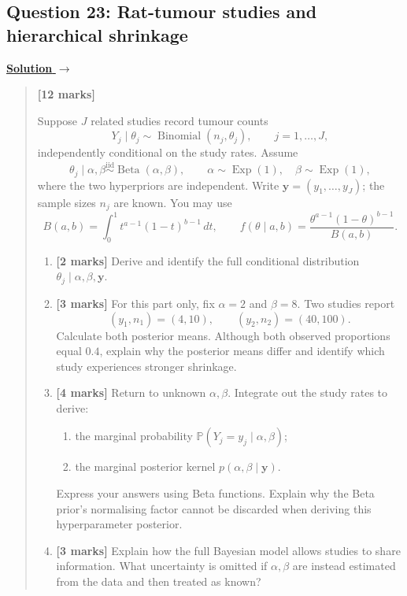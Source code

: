 \documentclass[11pt,a4paper]{article}
\newenvironment{examquestion}[2]
  {\subsection{#1}\label{question:\arabic{subsection}}\label{#2}%
   \noindent\hyperref[answer:\arabic{subsection}]{\textbf{Solution} $\rightarrow$}%
   \begin{quote}\color{statgrey}}
  {\end{quote}}
\begin{document}
\begin{examquestion}{Question 23: Rat-tumour studies and hierarchical shrinkage}{question:practice-rat-tumour-studies-and-hierarchical-shrinkage}
\textbf{[12 marks]}

Suppose $J$ related studies record tumour counts
\[
Y_j\mid\theta_j\sim\operatorname{Binomial}(n_j,\theta_j),
\qquad j=1,\ldots,J,
\]
independently conditional on the study rates. Assume
\[
\theta_j\mid\alpha,\beta
\overset{\mathrm{iid}}{\sim}\operatorname{Beta}(\alpha,\beta),
\qquad
\alpha\sim\operatorname{Exp}(1),\quad
\beta\sim\operatorname{Exp}(1),
\]
where the two hyperpriors are independent. Write
$\mathbf y=(y_1,\ldots,y_J)$; the sample sizes $n_j$ are known.
You may use
\[
B(a,b)=\int_0^1 t^{a-1}(1-t)^{b-1}\,dt,
\qquad
f(\theta\mid a,b)=\frac{\theta^{a-1}(1-\theta)^{b-1}}{B(a,b)}.
\]
\begin{enumerate}[label=(\alph*)]
  \item \textbf{[2 marks]} Derive and identify the full conditional
        distribution $\theta_j\mid\alpha,\beta,\mathbf y$.
  \item \textbf{[3 marks]} For this part only, fix $\alpha=2$ and $\beta=8$.
        Two studies report
        \[
        (y_1,n_1)=(4,10),\qquad (y_2,n_2)=(40,100).
        \]
        Calculate both posterior means. Although both observed proportions
        equal $0.4$, explain why the posterior means differ and identify
        which study experiences stronger shrinkage.
  \item \textbf{[4 marks]} Return to unknown $\alpha,\beta$. Integrate out
        the study rates to derive:
        \begin{enumerate}[label=(\roman*)]
          \item the marginal probability
                $\mathbb{P}(Y_j=y_j\mid\alpha,\beta)$;
          \item the marginal posterior kernel
                $p(\alpha,\beta\mid\mathbf y)$.
        \end{enumerate}
        Express your answers using Beta functions. Explain why the Beta
        prior's normalising factor cannot be discarded when deriving this
        hyperparameter posterior.
  \item \textbf{[3 marks]} Explain how the full Bayesian model allows
        studies to share information. What uncertainty is omitted if
        $\alpha,\beta$ are instead estimated from the data and then treated
        as known?
\end{enumerate}
\end{examquestion}
\end{document}
